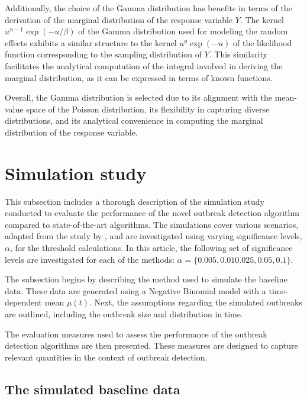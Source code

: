 \documentclass[preprint, 3p, authoryear]{elsarticle} %
\begin{document}
Additionally, the choice of the Gamma distribution has benefits in terms of the derivation of the marginal distribution of the response variable \(Y\). The kernel \(u^{\alpha-1}\exp(-u/\beta)\) of the Gamma distribution used for modeling the random effects exhibits a similar structure to the kernel \(u^y\exp(-u)\) of the likelihood function corresponding to the sampling distribution of \(Y\). This similarity facilitates the analytical computation of the integral involved in deriving the marginal distribution, as it can be expressed in terms of known functions.

Overall, the Gamma distribution is selected due to its alignment with the mean-value space of the Poisson distribution, its flexibility in capturing diverse distributions, and its analytical convenience in computing the marginal distribution of the response variable.

\hypertarget{simulation-study}{%
\section{Simulation study}\label{simulation-study}}

This subsection includes a thorough description of the simulation study conducted to evaluate the performance of the novel outbreak detection algorithm compared to state-of-the-art algorithms. The simulations cover various scenarios, adapted from the study by \citet{Noufaily_2013}, and are investigated using varying significance levels, \(\alpha\), for the threshold calculations. In this article, the following set of significance levels are investigated for each of the methods: \(\alpha=\{0.005, 0.01 0.025, 0.05, 0.1\}\).

The subsection begins by describing the method used to simulate the baseline data. These data are generated using a Negative Binomial model with a time-dependent mean \(\mu(t)\). Next, the assumptions regarding the simulated outbreaks are outlined, including the outbreak size and distribution in time.

The evaluation measures used to assess the performance of the outbreak detection algorithms are then presented. These measures are designed to capture relevant quantities in the context of outbreak detection.

\hypertarget{the-simulated-baseline-data}{%
\subsection{The simulated baseline data}\label{the-simulated-baseline-data}}
\end{document}
